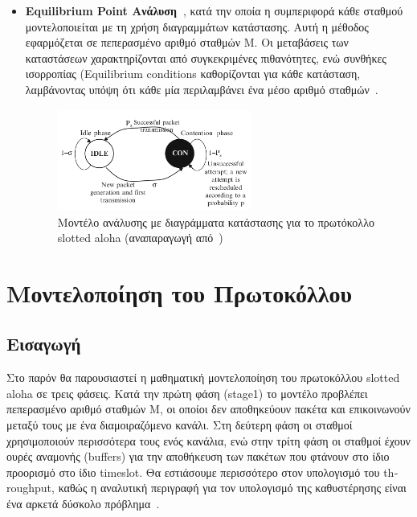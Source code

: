 \documentclass[12pt]{report}
\begin{document}
\begin{itemize}
  \item \textbf{\textlatin{Equilibrium Point} Ανάλυση~\cite{book:01}}, κατά την οποία η συμπεριφορά κάθε σταθμού μοντελοποιείται με τη χρήση διαγραμμάτων κατάστασης. Αυτή η μέθοδος εφαρμόζεται σε πεπερασμένο αριθμό σταθμών \textlatin{M}. Οι μεταβάσεις των καταστάσεων χαρακτηρίζονται από συγκεκριμένες πιθανότητες, ενώ συνθήκες ισορροπίας (\textlatin{Equilibrium conditions} καθορίζονται για κάθε κατάσταση, λαμβάνοντας υπόψη ότι κάθε μία περιλαμβάνει ένα μέσο αριθμό σταθμών~\cite{book:03}.

  \begin{figure}[ht]
  \centering
  \includegraphics[width=0.6\textwidth]{state_dia}
  \caption{Μοντέλο ανάλυσης με διαγράμματα κατάστασης για το πρωτόκολλο \textlatin{slotted aloha} (αναπαραγωγή από~\cite{book:01})}
  \label{fig:state_dia}
  \end{figure}

\end{itemize}

\chapter{Μοντελοποίηση του Πρωτοκόλλου}\label{ch2}

\section{Εισαγωγή}
Στο παρόν θα παρουσιαστεί η μαθηματική μοντελοποίηση του πρωτοκόλλου \textlatin{slotted aloha} σε τρεις φάσεις. Κατά την πρώτη φάση (\textlatin{stage1}) το μοντέλο προβλέπει πεπερασμένο αριθμό σταθμών \textlatin{M}, οι οποίοι δεν αποθηκεύουν πακέτα και επικοινωνούν μεταξύ τους με
ένα διαμοιραζόμενο κανάλι. Στη δεύτερη φάση οι σταθμοί χρησιμοποιούν περισσότερα τους ενός κανάλια, ενώ στην τρίτη φάση οι σταθμοί έχουν ουρές αναμονής (\textlatin{buffers}) για την αποθήκευση των πακέτων που φτάνουν στο ίδιο προορισμό στο ίδιο \textlatin{timeslot}. Θα εστιάσουμε περισσότερο στον υπολογισμό του \textlatin{throughput}, καθώς η αναλυτική περιγραφή για τον υπολογισμό της καθυστέρησης είναι ένα αρκετά δύσκολο πρόβλημα~\cite{book:05}.
\end{document}
